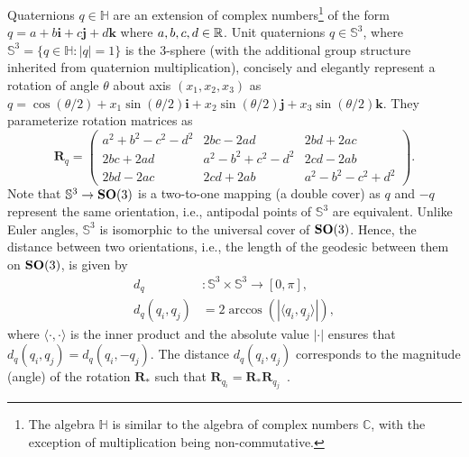 Quaternions $q \in \mathbb{H}$ are an extension of complex numbers\footnote{The algebra $\mathbb{H}$ is similar to the algebra of complex numbers $\mathbb{C}$, with the exception of multiplication being non-commutative.} of the form $q = a + b\boldsymbol{i} + c\boldsymbol{j} + d\boldsymbol{k}$ where $a,b,c,d \in \mathbb{R}$.
Unit quaternions $q \in \mathbb{S}^3$, where $\mathbb{S}^3 = \big\{ q \in \mathbb{H}: \lvert q \rvert = 1 \big\}$ is the 3-sphere (with the additional group structure inherited from quaternion multiplication), concisely and elegantly represent a rotation of angle $\theta$ about axis $(x_1, x_2, x_3)$ as $q = \cos(\theta/2) + x_1 \sin(\theta/2) \boldsymbol{i} + x_2 \sin(\theta/2) \boldsymbol{j} + x_3 \sin(\theta/2) \boldsymbol{k}$.
They parameterize rotation matrices as
\begin{equation*}
    \mathbf{R}_q =
    \begin{pmatrix}
        a^2+b^2-c^2-d^2 & 2bc-2ad & 2bd+2ac \\
        2bc+2ad & a^2-b^2+c^2-d^2 & 2cd-2ab \\
        2bd-2ac & 2cd+2ab & a^2-b^2-c^2+d^2
    \end{pmatrix}.
\end{equation*}
Note that $\mathbb{S}^3 \rightarrow \mathrm{\mathbf{SO}}(3)$ is a two-to-one mapping (a double cover) as $q$ and $-q$ represent the same orientation, i.e., antipodal points of $\mathbb{S}^3$ are equivalent.
Unlike Euler angles, $\mathbb{S}^3$ is isomorphic to the universal cover of $\mathrm{\mathbf{SO}}(3)$.
Hence, the distance between two orientations, i.e., the length of the geodesic between them on $\mathrm{\mathbf{SO}}(3)$, is given by
\begin{equation}
    \begin{aligned}
        d_q &: \mathbb{S}^3 \times \mathbb{S}^3 \rightarrow [0,\pi], \\
        d_q(q_i, q_j) &= 2 \arccos \left( \left| \langle q_i, q_j \rangle \right| \right),
    \label{eqn:distance:orientations}
    \end{aligned}
\end{equation}
where $\langle \cdot, \cdot \rangle$ is the inner product and the absolute value $\left| \cdot \right|$ ensures that $d_q(q_i, q_j) = d_q(q_i, -q_j)$.
The distance $d_q(q_i, q_j)$ corresponds to the magnitude (angle) of the rotation $\mathbf{R}_*$ such that $\mathbf{R}_{q_i} = \mathbf{R}_* \mathbf{R}_{q_j}$~\cite{huynh2009metrics}.

